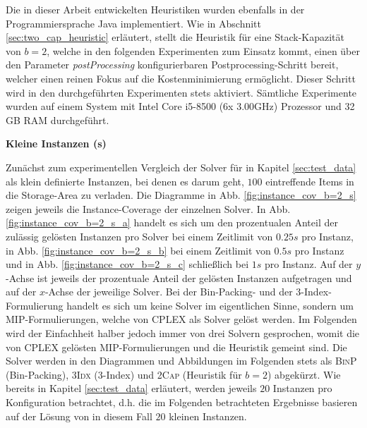 Die in dieser Arbeit entwickelten Heuristiken wurden ebenfalls in der Programmiersprache Java implementiert.
Wie in Abschnitt \ref{sec:two_cap_heuristic} erläutert, stellt die Heuristik für eine Stack-Kapazität von $b = 2$,
welche in den folgenden Experimenten zum Einsatz kommt, einen über den Parameter \textit{postProcessing} konfigurierbaren
Postprocessing-Schritt bereit, welcher einen reinen Fokus auf die Kostenminimierung ermöglicht. Dieser Schritt wird
in den durchgeführten Experimenten stets aktiviert. Sämtliche Experimente wurden auf einem System mit Intel Core i5-8500 (6x 3.00GHz) Prozessor und 32 GB RAM durchgeführt.\newline

\textbf{Kleine Instanzen (s)}

Zunächst zum experimentellen Vergleich der Solver für in Kapitel \ref{sec:test_data} als klein definierte Instanzen,
bei denen es darum geht, $100$ eintreffende Items in die Storage-Area zu verladen.
Die Diagramme in Abb. \ref{fig:instance_cov_b=2_s} zeigen jeweils die Instance-Coverage der einzelnen Solver.
In Abb. \ref{fig:instance_cov_b=2_s_a} handelt es sich um den prozentualen Anteil der zulässig gelösten Instanzen pro Solver bei einem Zeitlimit von $0.25s$ pro Instanz, in Abb. \ref{fig:instance_cov_b=2_s_b} bei einem Zeitlimit von $0.5s$ pro Instanz und in Abb. \ref{fig:instance_cov_b=2_s_c} schließlich bei $1s$ pro Instanz.\newline
Auf der $y$-Achse ist jeweils der prozentuale Anteil der gelösten Instanzen aufgetragen und auf der $x$-Achse der jeweilige Solver. Bei der Bin-Packing- und der 3-Index-Formulierung handelt es sich um keine Solver im eigentlichen Sinne,
sondern um MIP-Formulierungen, welche von \textsc{CPLEX} als Solver gelöst werden.
Im Folgenden wird der Einfachheit halber jedoch immer von drei Solvern gesprochen, womit die von
\textsc{CPLEX} gelösten MIP-Formulierungen und die Heuristik gemeint sind.
Die Solver werden in den Diagrammen und Abbildungen im Folgenden stets als \textsc{BinP} (Bin-Packing),
\textsc{3Idx} (3-Index) und \textsc{2Cap} (Heuristik für $b = 2$) abgekürzt.
Wie bereits in Kapitel \ref{sec:test_data} erläutert, werden jeweils $20$ Instanzen pro Konfiguration betrachtet,
d.h. die im Folgenden betrachteten Ergebnisse basieren auf der Lösung von in diesem Fall $20$ kleinen Instanzen.


